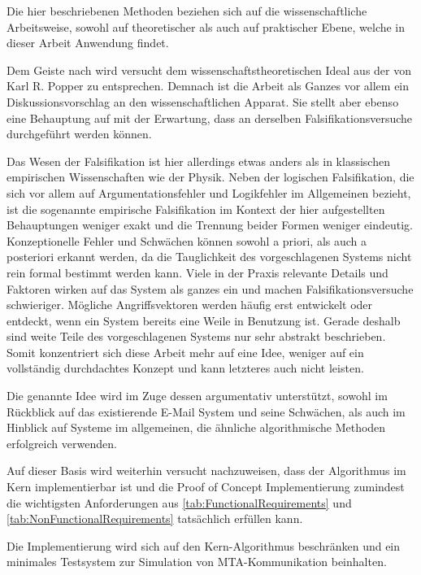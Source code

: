 Die hier beschriebenen Methoden beziehen sich auf die wissenschaftliche Arbeitsweise, sowohl auf theoretischer als auch auf praktischer Ebene, welche in dieser Arbeit Anwendung findet.

Dem Geiste nach wird versucht dem wissenschaftstheoretischen Ideal aus der   von Karl R. Popper zu entsprechen. Demnach ist die Arbeit als Ganzes vor allem ein Diskussionsvorschlag an den wissenschaftlichen Apparat. Sie stellt aber ebenso eine Behauptung auf mit der Erwartung, dass an derselben Falsifikationsversuche durchgeführt werden können.

Das Wesen der Falsifikation ist hier allerdings etwas anders als in klassischen empirischen Wissenschaften wie der Physik. Neben der logischen Falsifikation, die sich vor allem auf Argumentationsfehler und Logikfehler im Allgemeinen bezieht, ist die sogenannte empirische Falsifikation im Kontext der hier aufgestellten Behauptungen weniger exakt und die Trennung beider Formen weniger eindeutig. Konzeptionelle Fehler und Schwächen können sowohl a priori, als auch a posteriori erkannt werden, da die Tauglichkeit des vorgeschlagenen Systems nicht rein formal bestimmt werden kann. Viele in der Praxis relevante Details und Faktoren wirken auf das System als ganzes ein und machen Falsifikationsversuche schwieriger. Mögliche Angriffsvektoren werden häufig erst entwickelt oder entdeckt, wenn ein System bereits eine Weile in Benutzung ist. Gerade deshalb sind weite Teile des vorgeschlagenen Systems nur sehr abstrakt beschrieben. Somit konzentriert sich diese Arbeit mehr auf eine Idee, weniger auf ein vollständig durchdachtes Konzept und kann letzteres auch nicht leisten.

Die genannte Idee wird im Zuge dessen argumentativ unterstützt, sowohl im Rückblick auf das existierende E-Mail System und seine Schwächen, als auch im Hinblick auf Systeme im allgemeinen, die ähnliche algorithmische Methoden erfolgreich verwenden.

Auf dieser Basis wird weiterhin versucht nachzuweisen, dass der Algorithmus im Kern implementierbar ist und die Proof of Concept Implementierung zumindest die wichtigsten Anforderungen aus \autoref{tab:FunctionalRequirements} und \autoref{tab:NonFunctionalRequirements} tatsächlich erfüllen kann.

Die Implementierung wird sich auf den Kern-Algorithmus beschränken und ein minimales Testsystem zur Simulation von MTA-Kommunikation beinhalten.

